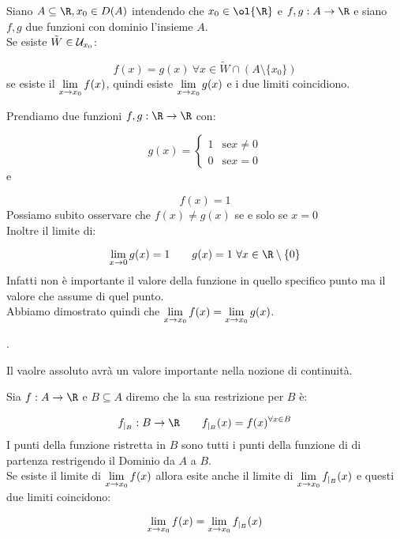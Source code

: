 \documentclass[../analisi.tex]{subfiles}
\begin{document}
\begin{defn}
Siano $ \acr, x_0 \in D(A)$ intendendo che $x_0 \in \ol{\R}$ e $f,g: A \to \R$
e siano $f, g$ due funzioni con dominio l'insieme $A$.\\
Se esiste $\tilde{W} \in \mathcal{U}_{x_0}$:

\begin{equation}
	f(x) = g(x)\ \forall x \in \tilde{W} \cap (A \setminus \{ x_0 \})
\end{equation}
se esiste il $\lim \limits_{x \to x_0} f(x)$, quindi esiste $\lim \limits_{x \to x_0} g(x)$ e i due limiti coincidiono.
\end{defn}


\begin{esem}
Prendiamo due funzioni $f, g: \R \to \R$ con:


\begin{equation}
	g(x) =
	\begin{cases}
		1 &\mbox{se} x \neq 0\\
		0 &\mbox{se} x = 0
	\end{cases}
\end{equation}
e 

\begin{equation}
	f(x) = 1
\end{equation}
Possiamo subito osservare che $f(x) \neq g(x)$ se e solo se $x = 0$ \\
Inoltre il limite di:

\begin{equation}
	\lim \limits_{x \to 0} g(x) = 1 \qquad g(x) = 1 \ \forall x \in \R
	\setminus \{0\}
\end{equation}
Infatti non è importante il valore della funzione in quello specifico punto ma
il valore che assume  di quel punto.\\
Abbiamo dimostrato quindi che $\lim \limits_{x \to x_0} f(x) = \lim \limits_{x \to x_0} g(x)$.
\end{esem}
.

Il vaolre assoluto avrà un valore importante nella nozione di continuità.


\begin{defn}
Sia $f: A \to \R$ e $B \subseteq A$ diremo che la sua restrizione per $B$ è:


\begin{equation}
	f_{|_B}: B \to \R \qquad f_{|_B}(x) = f(x)^{\forall x \in B}
\end{equation}
I punti della funzione ristretta in $B$ sono tutti i punti della funzione di
di partenza restrigendo il Dominio da $A$ a $B$.\\
Se esiste il limite di $\lim \limits_{x \to x_0} f(x)$ allora esite anche il limite
di $\lim \limits_{x \to x_0} f_{|_B} (x)$ e questi due limiti coincidono:

	\begin{equation}
		\lim \limits_{x \to x_0} f(x) = \lim \limits_{x \to x_0} f_{|_B} (x)
	\end{equation}
\end{defn}
\end{document}
